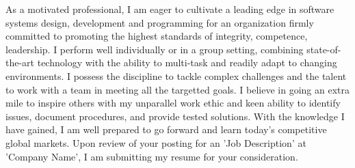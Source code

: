 \documentclass[11pt, a4paper]{awesome-cv}
\begin{document}
\begin{cvletter}
As a motivated professional, I am eager to cultivate a leading edge in software systems design, development and programming for an organization firmly committed to promoting the highest standards of integrity, competence, leadership. I perform well individually or in a group setting, combining state-of-the-art technology with the ability to multi-task and readily adapt to changing environments. I possess the discipline to tackle complex challenges and the talent to work with a team in meeting all the targetted goals. I believe in going an extra mile to inspire others with my unparallel work ethic and keen ability to identify issues, document procedures, and provide tested solutions. With the knowledge I have gained, I am well prepared to go forward and learn today's competitive global markets. Upon review of your posting for an 'Job Description' at 'Company Name', I am submitting my resume for your consideration.

\end{cvletter}

\makeletterclosing
\end{document}
